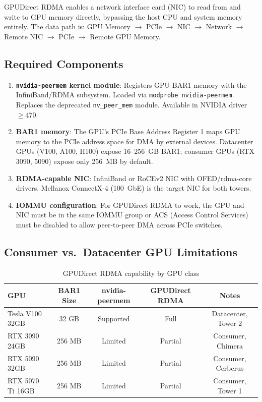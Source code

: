 \documentclass[11pt,letterpaper]{article}
\begin{document}
GPUDirect RDMA enables a network interface card (NIC) to read from and write to GPU memory directly, bypassing the host CPU and system memory entirely. The data path is: GPU Memory $\to$ PCIe $\to$ NIC $\to$ Network $\to$ Remote NIC $\to$ PCIe $\to$ Remote GPU Memory.

\subsection{Required Components}

\begin{enumerate}[noitemsep]
    \item \textbf{\texttt{nvidia-peermem} kernel module}: Registers GPU BAR1 memory with the InfiniBand/RDMA subsystem. Loaded via \texttt{modprobe nvidia-peermem}. Replaces the deprecated \texttt{nv\_peer\_mem} module. Available in NVIDIA driver $\geq$470.
    \item \textbf{BAR1 memory}: The GPU's PCIe Base Address Register 1 maps GPU memory to the PCIe address space for DMA by external devices. Datacenter GPUs (V100, A100, H100) expose 16--256~GB BAR1; consumer GPUs (RTX 3090, 5090) expose only 256~MB by default.
    \item \textbf{RDMA-capable NIC}: InfiniBand or RoCEv2 NIC with OFED/rdma-core drivers. Mellanox ConnectX-4 (100~GbE) is the target NIC for both towers.
    \item \textbf{IOMMU configuration}: For GPUDirect RDMA to work, the GPU and NIC must be in the same IOMMU group or ACS (Access Control Services) must be disabled to allow peer-to-peer DMA across PCIe switches.
\end{enumerate}

\subsection{Consumer vs.\ Datacenter GPU Limitations}

\begin{table}[htbp]
\centering
\caption{GPUDirect RDMA capability by GPU class}
\label{tab:gpudirect-caps}
\begin{tabular}{@{}lcccc@{}}
\toprule
\textbf{GPU} & \textbf{BAR1 Size} & \textbf{nvidia-peermem} & \textbf{GPUDirect RDMA} & \textbf{Notes} \\
\midrule
Tesla V100 32GB & 32 GB & Supported & Full & Datacenter, Tower 2 \\
RTX 3090 24GB & 256 MB & Limited & Partial & Consumer, Chimera \\
RTX 5090 32GB & 256 MB & Limited & Partial & Consumer, Cerberus \\
RTX 5070 Ti 16GB & 256 MB & Limited & Partial & Consumer, Tower 1 \\
\bottomrule
\end{tabular}
\end{table}
\end{document}
